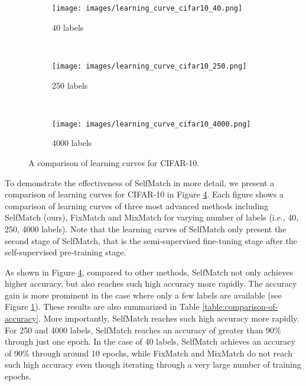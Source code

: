 \documentclass{article}
\begin{document}
\begin{figure}[h]
  \begin{subfigure}{0.3\textwidth}
  \texttt{[image: images/learning\_curve\_cifar10\_40.png]}
  \caption{40 labels}
  \label{fig:learning-curve-cifar10-40labels}
  \end{subfigure}
  ~
  \begin{subfigure}{0.3\textwidth}
  \texttt{[image: images/learning\_curve\_cifar10\_250.png]}
  \caption{250 labels}
  \label{fig:learning-curve-cifar10-250labels}
  \end{subfigure}
  ~
  \begin{subfigure}{0.3\textwidth}
  \texttt{[image: images/learning\_curve\_cifar10\_4000.png]}
  \caption{4000 labels}
  \label{fig:learning-curve-cifar10-4000labels}
  \end{subfigure}
  
  \caption{A comparison of learning curves for CIFAR-10.}
  \label{fig:comparison-of-learning-curves}
\end{figure}

To demonstrate the effectiveness of SelfMatch in more detail, we present a comparison of learning curves for CIFAR-10 in Figure \ref{fig:comparison-of-learning-curves}. Each figure shows a comparison of learning curves of three most advanced methods including SelfMatch (ours), FixMatch \cite{sohn2020fixmatch} and MixMatch \cite{berthelot2019mixmatch} for varying number of labels (i.e., 40, 250, 4000 labels). Note that the learning curves of SelfMatch only present the second stage of SelfMatch, that is the semi-supervised fine-tuning stage after the self-supervised pre-training stage. 

As shown in Figure \ref{fig:comparison-of-learning-curves}, compared to other methods, SelfMatch not only achieves higher accuracy, but also reaches such high accuracy more rapidly. The accuracy gain is more prominent in the case where only a few labels are available (see Figure \ref{fig:learning-curve-cifar10-40labels}). These results are also summarized in Table \ref{table:comparison-of-accuracy}. More importantly, SelfMatch reaches such high accuracy more rapidly. For 250 and 4000 labels, SelfMatch reaches an accuracy of greater than 90\% through just one epoch. In the case of 40 labels, SelfMatch achieves an accuracy of 90\% through around 10 epochs, while FixMatch and MixMatch do not reach such high accuracy even though iterating through a very large number of training epochs.        \newpage
\end{document}

